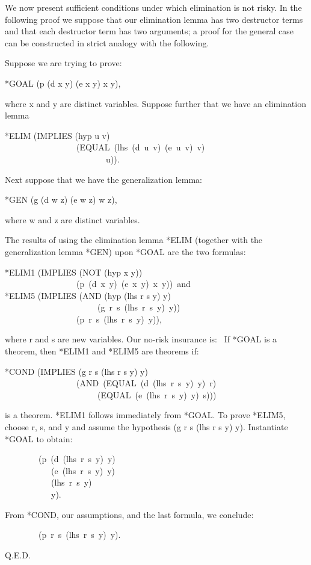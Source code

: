 \documentclass[10pt]{book}
\newenvironment{pubasis}{\begin{flushleft}}{\end{flushleft}}
\begin{document}
We now present sufficient conditions under which
elimination is not risky.  In the following
proof we suppose that our elimination lemma has
two destructor terms and that each destructor
term has two arguments; a proof for the
general case can be constructed in strict
analogy with the following.  

Suppose we are trying to prove:
\begin{pubasis}
*GOAL	(p (d x y) (e x y) x y),\\
\end{pubasis}
where x and y are distinct variables.  Suppose
further that we have an elimination lemma
\begin{pubasis}
*ELIM	(IMPLIES (hyp u v)\\
~~~~~~~~~~~~~~~~~(EQUAL~(lhs~(d~u~v)~(e~u~v)~v)\\
~~~~~~~~~~~~~~~~~~~~~~~~u)).\\
\end{pubasis}
Next suppose that we have the generalization lemma:
\begin{pubasis}
*GEN	(g (d w z) (e w z) w z),\\
\end{pubasis}
where w and z are distinct variables.

The results of using the elimination lemma *ELIM
(together with the generalization lemma *GEN)
upon *GOAL are the two formulas:
\begin{pubasis}
*ELIM1	(IMPLIES (NOT (hyp x y))\\
~~~~~~~~~~~~~~~~~(p~(d~x~y)~(e~x~y)~x~y))~and\\

*ELIM5	(IMPLIES (AND (hyp (lhs r s y) y)\\
~~~~~~~~~~~~~~~~~~~~~~(g~r~s~(lhs~r~s~y)~y))\\
~~~~~~~~~~~~~~~~~(p~r~s~(lhs~r~s~y)~y)),\\
\end{pubasis}
where r and s are new variables.  Our no-risk insurance is:~
If *GOAL is a theorem, then *ELIM1 and *ELIM5
are theorems if:
\begin{pubasis}
*COND	(IMPLIES (g r s (lhs r s y) y)\\
~~~~~~~~~~~~~~~~~(AND~(EQUAL~(d~(lhs~r~s~y)~y)~r)\\
~~~~~~~~~~~~~~~~~~~~~~(EQUAL~(e~(lhs~r~s~y)~y)~s)))\\
\end{pubasis}
is a theorem.  *ELIM1 follows immediately from *GOAL.  To prove
*ELIM5, choose r, s, and y and assume the hypothesis
(g r s (lhs r s y) y).  Instantiate *GOAL to obtain:
\begin{pubasis}
~~~~~~~~(p~(d~(lhs~r~s~y)~y)\\
~~~~~~~~~~~(e~(lhs~r~s~y)~y)\\
~~~~~~~~~~~(lhs~r~s~y)\\
~~~~~~~~~~~y).\\
\end{pubasis}
From *COND, our assumptions, and the last formula, we 
conclude:
\begin{pubasis}
~~~~~~~~(p~r~s~(lhs~r~s~y)~y).\\
\end{pubasis}
Q.E.D.
\end{document}
